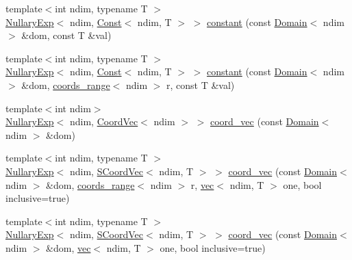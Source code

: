 \begin{DoxyCompactItemize}
\item 
{\footnotesize template$<$int ndim, typename T $>$ }\\\hyperlink{classshark_1_1ndim_1_1_nullary_exp}{Nullary\+Exp}$<$ ndim, \hyperlink{classshark_1_1ndim_1_1_const}{Const}$<$ ndim, T $>$ $>$ \hyperlink{namespaceshark_1_1ndim_ac0114ef6c7c29d0b6cd96cf61f6cc089}{constant} (const \hyperlink{classshark_1_1ndim_1_1_domain}{Domain}$<$ ndim $>$ \&dom, const T \&val)
\item 
{\footnotesize template$<$int ndim, typename T $>$ }\\\hyperlink{classshark_1_1ndim_1_1_nullary_exp}{Nullary\+Exp}$<$ ndim, \hyperlink{classshark_1_1ndim_1_1_const}{Const}$<$ ndim, T $>$ $>$ \hyperlink{namespaceshark_1_1ndim_ad9270694b8f4db58c84aff52b048183c}{constant} (const \hyperlink{classshark_1_1ndim_1_1_domain}{Domain}$<$ ndim $>$ \&dom, \hyperlink{structshark_1_1ndim_1_1coords__range}{coords\+\_\+range}$<$ ndim $>$ r, const T \&val)
\item 
{\footnotesize template$<$int ndim$>$ }\\\hyperlink{classshark_1_1ndim_1_1_nullary_exp}{Nullary\+Exp}$<$ ndim, \hyperlink{classshark_1_1ndim_1_1_coord_vec}{Coord\+Vec}$<$ ndim $>$ $>$ \hyperlink{namespaceshark_1_1ndim_a79746b40d6df669922d2577ae022d531}{coord\+\_\+vec} (const \hyperlink{classshark_1_1ndim_1_1_domain}{Domain}$<$ ndim $>$ \&dom)
\item 
{\footnotesize template$<$int ndim, typename T $>$ }\\\hyperlink{classshark_1_1ndim_1_1_nullary_exp}{Nullary\+Exp}$<$ ndim, \hyperlink{classshark_1_1ndim_1_1_s_coord_vec}{S\+Coord\+Vec}$<$ ndim, T $>$ $>$ \hyperlink{namespaceshark_1_1ndim_a6dc6b1b683a83691834cee32ab8a0bd7}{coord\+\_\+vec} (const \hyperlink{classshark_1_1ndim_1_1_domain}{Domain}$<$ ndim $>$ \&dom, \hyperlink{structshark_1_1ndim_1_1coords__range}{coords\+\_\+range}$<$ ndim $>$ r, \hyperlink{structshark_1_1ndim_1_1vec}{vec}$<$ ndim, T $>$ one, bool inclusive=true)
\item 
{\footnotesize template$<$int ndim, typename T $>$ }\\\hyperlink{classshark_1_1ndim_1_1_nullary_exp}{Nullary\+Exp}$<$ ndim, \hyperlink{classshark_1_1ndim_1_1_s_coord_vec}{S\+Coord\+Vec}$<$ ndim, T $>$ $>$ \hyperlink{namespaceshark_1_1ndim_a6beec51528cef95c43479d8e4c378c99}{coord\+\_\+vec} (const \hyperlink{classshark_1_1ndim_1_1_domain}{Domain}$<$ ndim $>$ \&dom, \hyperlink{structshark_1_1ndim_1_1vec}{vec}$<$ ndim, T $>$ one, bool inclusive=true)
\item 

\end{DoxyCompactItemize}
